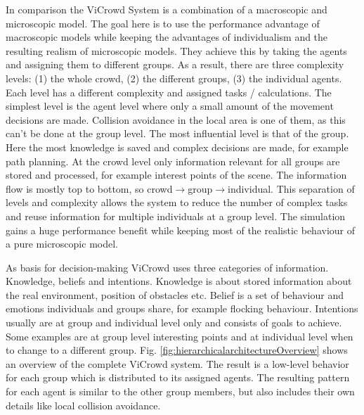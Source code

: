 \documentclass{acmsiggraph}               %
\begin{document}
In comparison the ViCrowd System  \label{exp:musse_hierarchical_2001} is a combination of a macroscopic and microscopic model. The goal here is to use the performance advantage of macroscopic models while keeping the advantages of individualism and the resulting realism of microscopic models.
They achieve this by taking the agents and assigning them to different groups. As a result, there are three complexity levels: (1) the whole crowd, (2) the different groups, (3) the individual agents. 
Each level has a different complexity and assigned tasks / calculations. 
The simplest level is the agent level where only a small amount of the movement decisions are made. Collision avoidance in the local area is one of them, as this can't be done at the group level.
The most influential level is that of the group. Here the most knowledge is saved and complex decisions are made, for example path planning.
At the crowd level only information relevant for all groups are stored and processed, for example interest points of the scene.
The information flow is mostly top to bottom, so crowd$\rightarrow$group$\rightarrow$individual.
This separation of levels and complexity allows the system to reduce the number of complex tasks and reuse information for multiple individuals at a group level. The simulation gains a huge performance benefit while keeping most of the realistic behaviour of a pure microscopic model. 

As basis for decision-making ViCrowd uses three categories of information. Knowledge, beliefs and intentions. 
Knowledge is about stored information about the real environment, position of obstacles etc. 
Belief is a set of behaviour and emotions individuals and groups share, for example flocking behaviour.
Intentions usually are at group and individual level only and consists of goals to achieve. Some examples are at group level interesting points and at individual level when to change to a different group.
Fig. \ref{fig:hierarchicalarchitectureOverview} shows an overview of the complete ViCrowd system. The result is a low-level behavior for each group which is distributed to its assigned agents. The resulting pattern for each agent is similar to the other group members, but also includes their own details like local collision avoidance.
\end{document}
